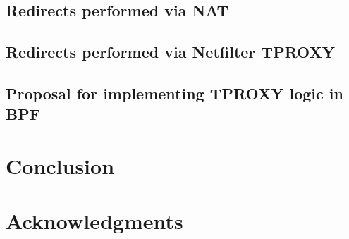 \documentclass[10pt,sigconf,authorversion]{lpc}
\begin{document}
\subsection{Redirects performed via NAT}

\subsection{Redirects performed via Netfilter TPROXY}

\subsection{Proposal for implementing TPROXY logic in BPF}

\section{Conclusion}

\section{Acknowledgments}




\end{document}
